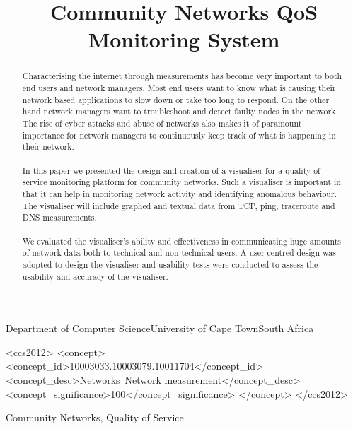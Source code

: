 \documentclass[plain]{sigplanconf}
\begin{document}
	\title{Community Networks QoS Monitoring System}

	{Department of Computer Science\linebreak University of Cape Town\linebreak South Africa}
	{}
	\maketitle

	\begin{abstract}
	\paragraph{}
	Characterising the internet through measurements has become very important to both end users and network
	managers. Most end users want to know what is causing their network based applications to slow down or take too long to respond. On the other hand network managers want to troubleshoot and detect faulty nodes in the network. The rise of cyber attacks and abuse of networks also makes it of paramount importance for network managers to continuously keep track of what is happening in their network.
	\paragraph{}
	In this paper we presented the design and creation of a visualiser for a quality of service monitoring platform for community networks. Such a visualiser is important in that it can help in monitoring network activity and identifying anomalous behaviour. The visualiser will include graphed and textual data from TCP, ping, traceroute and DNS measurements.
	\paragraph{}
	We evaluated the visualiser's ability and effectiveness in communicating huge amounts of network data both to technical and non-technical users. A user centred design was adopted to design the visualiser and usability tests were conducted to assess the usability and accuracy of the visualiser.
	\paragraph{}
	
	\end{abstract}
	\begin{CCSXML}
		<ccs2012>
		<concept>
		<concept_id>10003033.10003079.10011704</concept_id>
		<concept_desc>Networks~Network measurement</concept_desc>
		<concept_significance>100</concept_significance>
		</concept>
		</ccs2012>
	\end{CCSXML}
	\keywords
	Community Networks, Quality of Service
%
%
%
%
%
%
%
	
	
%	
\end{document}
